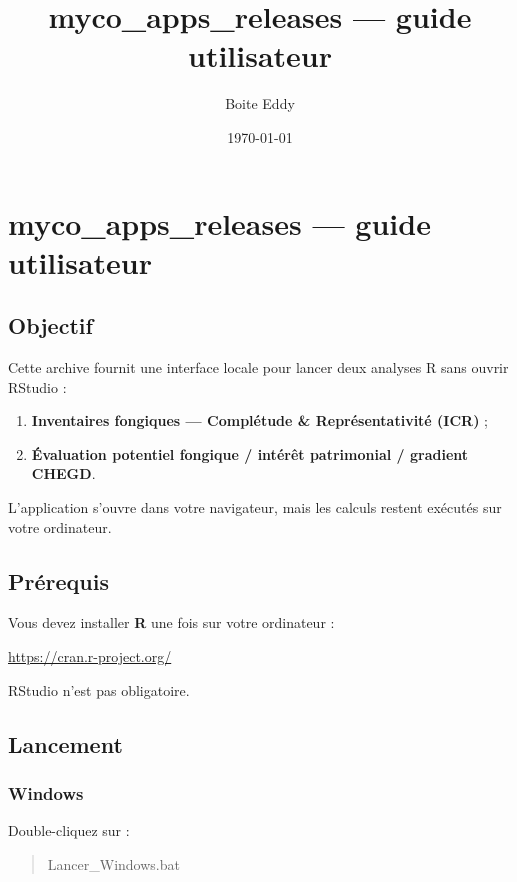 \documentclass[11pt,a4paper]{article}
\title{myco\_apps\_releases --- guide utilisateur}
\author{Boite Eddy}
\date{\today}
\providecommand{\tightlist}{\setlength{\itemsep}{0pt}\setlength{\parskip}{0pt}}
\newenvironment{Shaded}{\begin{quote}}{\end{quote}}
\newcommand{\NormalTok}[1]{#1}
\begin{document}
\maketitle
\section{myco\_apps\_releases --- guide
utilisateur}\label{myco_apps_releases-guide-utilisateur}

\subsection{Objectif}\label{objectif}

Cette archive fournit une interface locale pour lancer deux analyses R
sans ouvrir RStudio :

\begin{enumerate}
\def\labelenumi{\arabic{enumi}.}
\tightlist
\item
  \textbf{Inventaires fongiques --- Complétude \& Représentativité
  (ICR)} ;
\item
  \textbf{Évaluation potentiel fongique / intérêt patrimonial / gradient
  CHEGD}.
\end{enumerate}

L'application s'ouvre dans votre navigateur, mais les calculs restent
exécutés sur votre ordinateur.

\subsection{Prérequis}\label{pruxe9requis}

Vous devez installer \textbf{R} une fois sur votre ordinateur :

\url{https://cran.r-project.org/}

RStudio n'est pas obligatoire.

\subsection{Lancement}\label{lancement}

\subsubsection{Windows}\label{windows}

Double-cliquez sur :

\begin{Shaded}
\begin{Highlighting}[]
\NormalTok{Lancer\_Windows.bat}
\end{Highlighting}
\end{Shaded}
\end{document}
